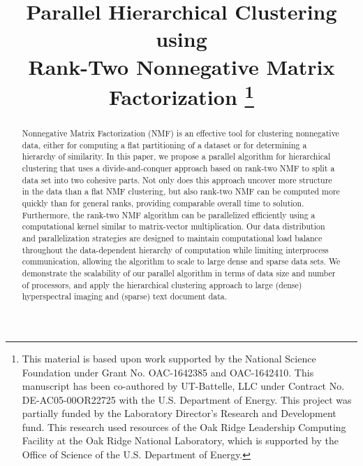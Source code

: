 \documentclass[conference,compsoc]{IEEEtran}
\begin{document}
\title{Parallel Hierarchical Clustering using \\ Rank-Two Nonnegative Matrix Factorization
\thanks{This material is based upon work supported by the National Science Foundation under Grant No. OAC-1642385 and OAC-1642410.
This manuscript has been co-authored by UT-Battelle, LLC under Contract No. DE-AC05-00OR22725 with the U.S. Department of
Energy. This project was partially funded by the Laboratory Director's Research and Development fund. This research used resources
of the Oak Ridge Leadership Computing Facility at the Oak Ridge National Laboratory, which is supported by the Office of Science of
the U.S. Department of Energy.}
}

\author{
\and
{}
\and
{}
}

\maketitle

\begin{abstract}
Nonnegative Matrix Factorization (NMF) is an effective tool for clustering nonnegative data, either for computing a flat partitioning of a dataset or for determining a hierarchy of similarity.
In this paper, we propose a parallel algorithm for hierarchical clustering that uses a divide-and-conquer approach based on rank-two NMF to split a data set into two cohesive parts.
Not only does this approach uncover more structure in the data than a flat NMF clustering, but also rank-two NMF can be computed more quickly than for general ranks, providing comparable overall time to solution.
Furthermore, the rank-two NMF algorithm can be parallelized efficiently using a computational kernel similar to matrix-vector multiplication.
Our data distribution and parallelization strategies are designed to maintain computational load balance throughout the data-dependent hierarchy of computation while limiting interprocess communication, allowing the algorithm to scale to large dense and sparse data sets.
We demonstrate the scalability of our parallel algorithm in terms of data size and number of processors, and apply the hierarchical clustering approach to large (dense) hyperspectral imaging and (sparse) text document data.
\end{abstract}
\end{document}
